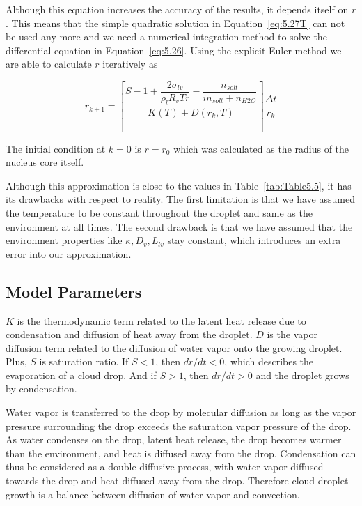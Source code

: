 \documentclass[titlepage]{article}
\begin{document}
Although this equation increases the accuracy of the results, it depends itself
on $r$. This means that the simple quadratic solution in
Equation~\eqref{eq:5.27T} can not be used any more and we need a numerical
integration method to solve the differential equation in
Equation~\eqref{eq:5.26}. Using the explicit Euler method we are able to
calculate $r$ iteratively as

\begin{equation}
    \label{eq:Iteration}
    r_{k+1}= \left[ \dfrac{S - 1+\dfrac{2\sigma_{lv}}{\rho_{l}R_{v}Tr} - \dfrac{n_{solt}}{i n_{solt}+n_{H2O}}}{K(T) + D(r_{k},T)} \right] \dfrac{\Delta t}{r_{k}}
\end{equation}

The initial condition at $k=0$ is $r=r_0$ which was calculated as the radius
of the nucleus core itself.

Although this approximation is close to the values in Table~\ref{tab:Table5.5},
it has its drawbacks with respect to reality. The first limitation is that we
have assumed the temperature to be constant throughout the droplet and same as
the environment at all times. The second drawback is that we have assumed that
the environment properties like $\kappa, D_{v}, L_{lv}$ stay constant, which
introduces an extra error into our approximation.


\subsection{Model Parameters}
$K$ is the thermodynamic term related to the latent heat release due to
condensation and diffusion of heat away from the droplet.  $D$ is the vapor
diffusion term related to the diffusion of water vapor onto the growing
droplet. Plus, $S$ is saturation ratio. If $S < 1$, then $dr/ dt < 0$, which
describes the evaporation of a cloud drop. And if $S > 1$, then $dr/dt > 0$ and
the droplet grows by condensation.

Water vapor is transferred to the drop by molecular diffusion as long as the
vapor pressure surrounding the drop exceeds the saturation vapor pressure of
the drop. As water condenses on the drop, latent heat release, the drop becomes
warmer than the environment, and heat is diffused away from the drop.
Condensation can thus be considered as a double diffusive process, with water
vapor diffused towards the drop and heat diffused away from the drop. Therefore
cloud droplet growth is a balance between diffusion of water vapor and
convection.
\end{document}
